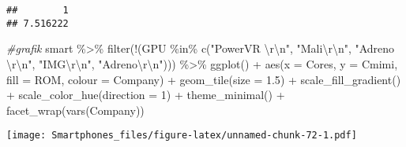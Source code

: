 \documentclass[
]{article}
\newenvironment{Shaded}{\begin{snugshade}}{\end{snugshade}}
\newcommand{\AttributeTok}[1]{\textcolor[rgb]{0.77,0.63,0.00}{#1}}
\newcommand{\CommentTok}[1]{\textcolor[rgb]{0.56,0.35,0.01}{\textit{#1}}}
\newcommand{\DecValTok}[1]{\textcolor[rgb]{0.00,0.00,0.81}{#1}}
\newcommand{\FloatTok}[1]{\textcolor[rgb]{0.00,0.00,0.81}{#1}}
\newcommand{\FunctionTok}[1]{\textcolor[rgb]{0.00,0.00,0.00}{#1}}
\newcommand{\NormalTok}[1]{#1}
\newcommand{\SpecialCharTok}[1]{\textcolor[rgb]{0.00,0.00,0.00}{#1}}
\newcommand{\StringTok}[1]{\textcolor[rgb]{0.31,0.60,0.02}{#1}}
\begin{document}
\begin{verbatim}
##        1 
## 7.516222
\end{verbatim}

\begin{Shaded}
\begin{Highlighting}[]
\CommentTok{\#grafik}
\NormalTok{smart }\SpecialCharTok{\%\textgreater{}\%}
 \FunctionTok{filter}\NormalTok{(}\SpecialCharTok{!}\NormalTok{(GPU }\SpecialCharTok{\%in\%} \FunctionTok{c}\NormalTok{(}\StringTok{"PowerVR }\SpecialCharTok{\textbackslash{}r\textbackslash{}n}\StringTok{"}\NormalTok{, }\StringTok{"Mali}\SpecialCharTok{\textbackslash{}r\textbackslash{}n}\StringTok{"}\NormalTok{, }\StringTok{"Adreno }\SpecialCharTok{\textbackslash{}r\textbackslash{}n}\StringTok{"}\NormalTok{, }\StringTok{"IMG}\SpecialCharTok{\textbackslash{}r\textbackslash{}n}\StringTok{"}\NormalTok{, }\StringTok{"Adreno}\SpecialCharTok{\textbackslash{}r\textbackslash{}n}\StringTok{"}\NormalTok{))) }\SpecialCharTok{\%\textgreater{}\%}
 \FunctionTok{ggplot}\NormalTok{() }\SpecialCharTok{+}
  \FunctionTok{aes}\NormalTok{(}\AttributeTok{x =}\NormalTok{ Cores, }\AttributeTok{y =}\NormalTok{ Cmimi, }\AttributeTok{fill =}\NormalTok{ ROM, }\AttributeTok{colour =}\NormalTok{ Company) }\SpecialCharTok{+}
  \FunctionTok{geom\_tile}\NormalTok{(}\AttributeTok{size =} \FloatTok{1.5}\NormalTok{) }\SpecialCharTok{+}
  \FunctionTok{scale\_fill\_gradient}\NormalTok{() }\SpecialCharTok{+}
  \FunctionTok{scale\_color\_hue}\NormalTok{(}\AttributeTok{direction =} \DecValTok{1}\NormalTok{) }\SpecialCharTok{+}
  \FunctionTok{theme\_minimal}\NormalTok{() }\SpecialCharTok{+}
  \FunctionTok{facet\_wrap}\NormalTok{(}\FunctionTok{vars}\NormalTok{(Company))}
\end{Highlighting}
\end{Shaded}

\texttt{[image: Smartphones\_files/figure-latex/unnamed-chunk-72-1.pdf]}
\end{document}
